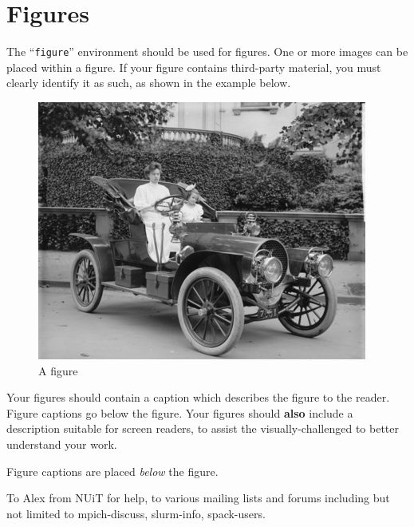 \documentclass[sigconf,authordraft]{acmart}
\begin{document}
\section{Figures}

The ``\verb|figure|'' environment should be used for figures. One or
more images can be placed within a figure. If your figure contains
third-party material, you must clearly identify it as such, as shown
in the example below.
\begin{figure}[h]
  \centering
  \includegraphics[width=\linewidth]{sample-franklin}
  \caption{A figure}
\end{figure}

Your figures should contain a caption which describes the figure to
the reader. Figure captions go below the figure. Your figures should
{\bfseries also} include a description suitable for screen readers, to
assist the visually-challenged to better understand your work.

Figure captions are placed {\itshape below} the figure.




\begin{acks}
To Alex from NUiT for help, to various mailing lists and forums including but not limited to mpich-discuss, slurm-info, spack-users.
\end{acks}
\end{document}
